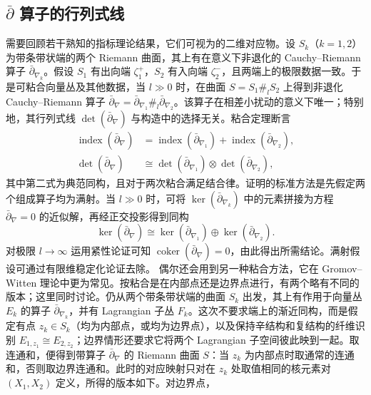 \subsection{\texorpdfstring{$\bar\partial$}{∂̄} 算子的行列式线}\label{sec:11c}
需要回顾若干熟知的指标理论结果，它们可视为的二维对应物。设 $S_k$（$k=1,\allowbreak 2$）为带条带状端的两个 Riemann 曲面，其上有在意义下非退化的 Cauchy–Riemann 算子 $\bar\partial_{\nabla_k}$。假设 $S_1$ 有出向端 $\zeta_1^+$，$S_2$ 有入向端 $\zeta_2^-$，且两端上的极限数据一致。于是可粘合向量丛及其他数据，当 $l\gg0$ 时，在曲面 $S=S_1\#_lS_2$ 上得到非退化 Cauchy–Riemann 算子 $\bar\partial_\nabla=\bar\partial_{\nabla_1}\#_l\bar\partial_{\nabla_2}$。该算子在相差小扰动的意义下唯一；特别地，其行列式线 $\det(\bar\partial_\nabla)$ 与构造中的选择无关。粘合定理断言
\begin{equation}\label{eq:11.9}
\begin{aligned}
\operatorname{index}(\bar\partial_\nabla)&=\operatorname{index}(\bar\partial_{\nabla_1})+\operatorname{index}(\bar\partial_{\nabla_2}),\\
\det(\bar\partial_\nabla)&\cong\det(\bar\partial_{\nabla_1})\otimes\det(\bar\partial_{\nabla_2}),
\end{aligned}
\end{equation}
其中第二式为典范同构，且对于两次粘合满足结合律。证明的标准方法是先假定两个组成算子均为满射。当 $l\gg0$ 时，可将 $\ker(\bar\partial_{\nabla_k})$ 中的元素拼接为方程 $\bar\partial_\nabla=0$ 的近似解，再经正交投影得到同构
\begin{equation}\label{eq:11.10}
\ker(\bar\partial_\nabla)\cong\ker(\bar\partial_{\nabla_1})\oplus\ker(\bar\partial_{\nabla_2}).
\end{equation}
对极限 $l\to\infty$ 运用紧性论证可知 $\operatorname{coker}(\bar\partial_\nabla)=0$，由此得出所需结论。满射假设可通过有限维稳定化论证去除。
偶尔还会用到另一种粘合方法，它在 Gromov–Witten 理论中更为常见。按粘合是在内部点还是边界点进行，有两个略有不同的版本；这里同时讨论。仍从两个带条带状端的曲面 $S_k$ 出发，其上有作用于向量丛 $E_k$ 的算子 $\bar\partial_{\nabla_k}$，并有 Lagrangian 子丛 $F_k$。这次不要求端上的渐近同构，而是假定有点 $z_k\in S_k$（均为内部点，或均为边界点），以及保持辛结构和复结构的纤维识别 $E_{1,\allowbreak z_1}\cong E_{2,\allowbreak z_2}$；边界情形还要求它将两个 Lagrangian 子空间彼此映到一起。取连通和，便得到带算子 $\bar\partial_\nabla$ 的 Riemann 曲面 $S$：当 $z_k$ 为内部点时取通常的连通和，否则取边界连通和。此时的对应映射只对在 $z_k$ 处取值相同的核元素对 $(X_1,\allowbreak X_2)$ 定义，所得的版本如下。对边界点，
